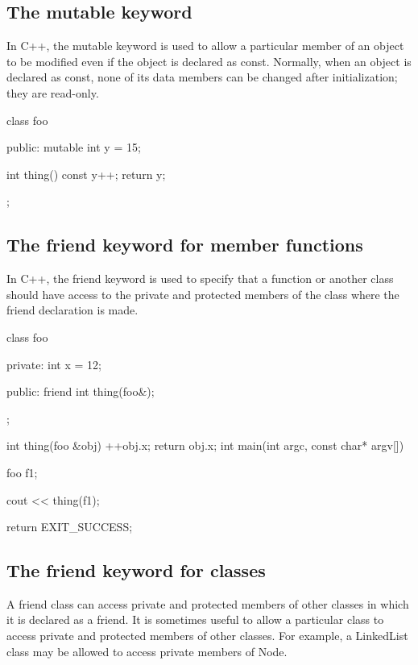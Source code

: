 \documentclass{report}
\begin{document}
    \bigbreak \noindent 
    \subsection{The mutable keyword}
    \bigbreak \noindent 
    In C++, the mutable keyword is used to allow a particular member of an object to be modified even if the object is declared as const. Normally, when an object is declared as const, none of its data members can be changed after initialization; they are read-only.
    \bigbreak \noindent 
    
    \begin{cppcode}
class foo {
public: 
    mutable int y = 15;
    
    int thing() const {
        y++;
        return y;
    }
};
    \end{cppcode}
    

    \pagebreak
    \subsection{The friend keyword for member functions}
    \bigbreak \noindent 
    In C++, the friend keyword is used to specify that a function or another class should have access to the private and protected members of the class where the friend declaration is made.
    \bigbreak \noindent 
    
    \begin{cppcode}
class foo {
private: 
    int x = 12;

public:
    friend int thing(foo&);
};

int thing(foo &obj) {
    ++obj.x;
    return obj.x;
}
int main(int argc, const char* argv[]) {

    foo f1;

    cout << thing(f1);
    
    return EXIT_SUCCESS;
}
    \end{cppcode}

    \bigbreak \noindent 
    \subsection{The friend keyword for classes}
    \bigbreak \noindent 
    A friend class can access private and protected members of other classes in which it is declared as a friend. It is sometimes useful to allow a particular class to access private and protected members of other classes. For example, a LinkedList class may be allowed to access private members of Node.
    \bigbreak \noindent 
\end{document}
